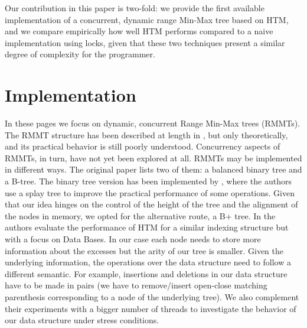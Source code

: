 \documentclass{llncs}
\begin{document}
Our contribution in this paper is two-fold: we provide the first available implementation of a concurrent, dynamic range Min-Max tree based on HTM, and we compare empirically how well HTM performs compared to a naive implementation using locks, given that these two techniques present a similar degree of complexity for the programmer. 
\vspace{-2mm}
\section{Implementation}
\vspace{-4mm}
In these pages we focus on dynamic, concurrent Range Min-Max trees (RMMTs). The RMMT structure has been described at length in \cite{Navarro:2014:FFS:2620785.2601073}, but only theoretically, and its practical behavior is still poorly understood. Concurrency aspects of RMMTs, in turn, have not yet been explored at all. RMMTs may be implemented in different ways. The original paper lists two of them: a balanced binary tree and a B-tree. The binary tree version has been implemented by \cite{Joannou:2012:DST:2366685.2366707}, where the authors use a splay tree to improve the practical performance of some operations. Given that our idea hinges on the control of the height of the tree and the alignment of the nodes in memory, we opted for the alternative route, a B+ tree. In \cite{KarnagelDRLLSL14} the authors evaluate the performance of HTM for a similar indexing structure but with a focus on Data Bases. In our case each node needs to store more information about the excesses but the arity of our tree is smaller. Given the underlying information, the operations over the data structure need to follow a different semantic. For example, insertions and deletions in our data structure have to be made in pairs (we have to remove/insert open-close matching parenthesis corresponding to a node of the underlying tree). We also complement their experiments with a bigger number of threads to investigate the behavior of our data structure under stress conditions.
\end{document}
